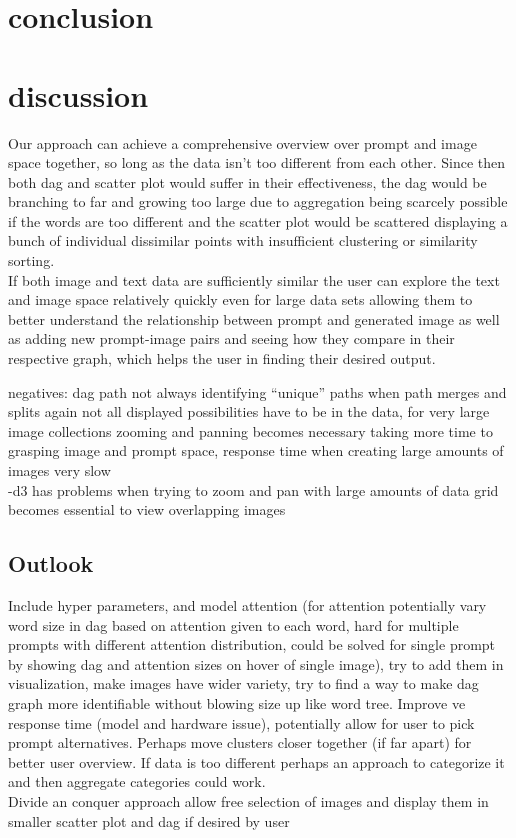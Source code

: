 \documentclass[
  a4paper,  %
  twoside,  %
  bibliography=totoc,
  headsepline,
  cleardoublepage=empty,
  parskip=half,
  draft=false
]{scrbook}
\begin{document}
\chapter{conclusion}
\chapter{discussion}
\label{chap:zusfas}
Our approach can achieve a comprehensive overview over prompt and image space together, so long as the data isn't too different from each other. Since then both dag and scatter plot would suffer in their effectiveness, the dag would be branching to far and growing too large due to aggregation being scarcely possible if the words are too different and the scatter plot would be scattered displaying a bunch of individual dissimilar points with insufficient clustering or similarity sorting.\\ If both image and text data are sufficiently similar the user can explore the text and image space relatively quickly even for large data sets allowing them to better understand the relationship between prompt and generated image as well as adding new prompt-image pairs and seeing how they compare in their respective graph, which helps the user in finding their desired output.


negatives: dag path not always identifying \enquote{unique} paths when path merges and splits again not all displayed possibilities have to be in the data, 
for very large image collections zooming and panning becomes necessary taking more time to grasping image and prompt space, response time when creating large amounts of images very slow \\
-d3 has problems when trying to zoom and pan with large amounts of data grid becomes essential to view overlapping images



\section{Outlook}
Include hyper parameters, and model attention (for attention potentially vary word size in dag based on attention given to each word, hard for multiple prompts with different attention distribution, could be solved for single prompt by showing dag and attention sizes on hover of single image), try to add them in visualization, make images have wider variety, try to find a way to make dag graph more identifiable without blowing size up like word tree. Improve ve response time (model and hardware issue), potentially allow for user to pick prompt alternatives. Perhaps move clusters closer together (if far apart) for better user overview. If data is too different perhaps an approach to categorize it and then aggregate categories could work.\\
Divide an conquer approach allow free selection of images and display them in smaller scatter plot and dag if desired by user
\printbibliography
\end{document}
